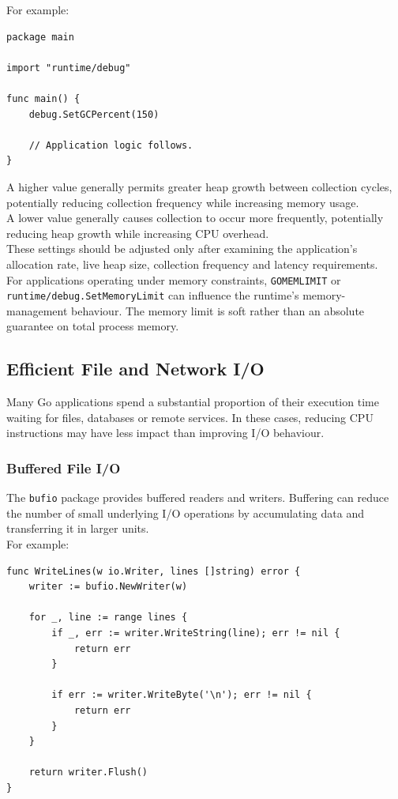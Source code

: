 For example:

\begin{lstlisting}
package main

import "runtime/debug"

func main() {
    debug.SetGCPercent(150)

    // Application logic follows.
}
\end{lstlisting}

A higher value generally permits greater heap growth between collection cycles, potentially reducing collection frequency while increasing memory usage.\\

A lower value generally causes collection to occur more frequently, potentially reducing heap growth while increasing CPU overhead.\\

These settings should be adjusted only after examining the application's allocation rate, live heap size, collection frequency and latency requirements.\\

For applications operating under memory constraints, \texttt{GOMEMLIMIT} or \texttt{runtime/debug.SetMemoryLimit} can influence the runtime's memory-management behaviour. The memory limit is soft rather than an absolute guarantee on total process memory.\\

\subsection{Efficient File and Network I/O}

Many Go applications spend a substantial proportion of their execution time waiting for files, databases or remote services. In these cases, reducing CPU instructions may have less impact than improving I/O behaviour.\\

\subsubsection{Buffered File I/O}

The \texttt{bufio} package provides buffered readers and writers. Buffering can reduce the number of small underlying I/O operations by accumulating data and transferring it in larger units.\\

For example:

\begin{lstlisting}
func WriteLines(w io.Writer, lines []string) error {
    writer := bufio.NewWriter(w)

    for _, line := range lines {
        if _, err := writer.WriteString(line); err != nil {
            return err
        }

        if err := writer.WriteByte('\n'); err != nil {
            return err
        }
    }

    return writer.Flush()
}
\end{lstlisting}


